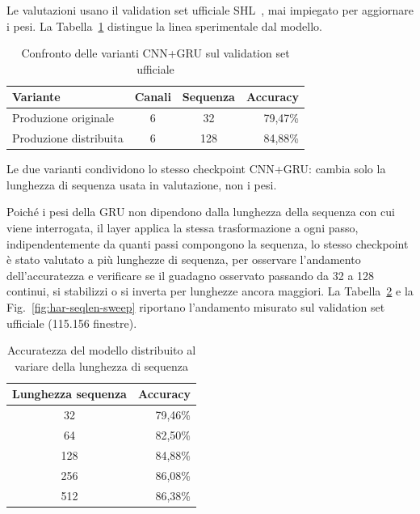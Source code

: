 \documentclass[conference]{IEEEtran}
\begin{document}
Le valutazioni usano il validation set ufficiale SHL~\cite{wang2018shl},
mai impiegato per aggiornare i pesi. La Tabella~\ref{tab:har-variants}
distingue la linea sperimentale dal modello.

\begin{table}[htbp]
\caption{Confronto delle varianti CNN+GRU sul validation set ufficiale}
\centering
\scriptsize
\begin{tabular}{|l|c|c|r|}
\hline
\textbf{Variante} & \textbf{Canali} & \textbf{Sequenza} & \textbf{Accuracy} \\
\hline
Produzione originale & 6 & 32 & 79,47\% \\
\hline
Produzione distribuita & 6 & 128 & 84,88\% \\
\hline
\end{tabular}
\label{tab:har-variants}
\end{table}

Le due varianti condividono lo stesso checkpoint CNN+GRU: cambia solo
la lunghezza di sequenza usata in valutazione, non i pesi.

Poiché i pesi della GRU non dipendono dalla lunghezza della sequenza con
cui viene interrogata, il layer applica la stessa trasformazione a
ogni passo, indipendentemente da quanti passi compongono la sequenza,
lo stesso checkpoint è stato valutato a più lunghezze di sequenza, per
osservare l'andamento dell'accuratezza e verificare se il guadagno
osservato passando da 32 a 128 continui, si stabilizzi o si inverta
per lunghezze ancora maggiori. La Tabella~\ref{tab:har-seqlen-sweep} e
la Fig.~\ref{fig:har-seqlen-sweep} riportano l'andamento misurato
sul validation set ufficiale (115.156 finestre).

\begin{table}[htbp]
\caption{Accuratezza del modello distribuito al variare della lunghezza di sequenza}
\centering
\scriptsize
\begin{tabular}{|c|r|}
\hline
\textbf{Lunghezza sequenza} & \textbf{Accuracy} \\
\hline
32  & 79,46\% \\
\hline
64  & 82,50\% \\
\hline
128 & 84,88\% \\
\hline
256 & 86,08\% \\
\hline
512 & 86,38\% \\
\hline
\end{tabular}
\label{tab:har-seqlen-sweep}
\end{table}
\end{document}
